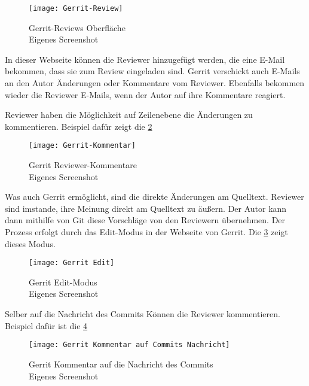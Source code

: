 \begin{figure}[H]
	\centering
	\texttt{[image: Gerrit-Review]}
	\caption[Gerrit Reviews Oberfläche]{Gerrit-Reviews Oberfläche\\Eigenes Screenshot}
	\label{fig:Gerrit-Review}
\end{figure}

In dieser Webseite können die Reviewer hinzugefügt werden, die eine E-Mail bekommen, dass sie zum Review eingeladen sind. Gerrit verschickt auch E-Mails an den Autor Änderungen oder Kommentare vom Reviewer. Ebenfalls bekommen wieder die Reviewer E-Mails, wenn der Autor auf ihre Kommentare reagiert.

Reviewer haben die Möglichkeit auf Zeilenebene die Änderungen zu kommentieren. Beispiel dafür zeigt die \cref{fig:Gerrit Reviewer-Kommentare} 

\begin{figure}[H]
	\centering
	\texttt{[image: Gerrit-Kommentar]}
	\caption[Gerrit Reviewer-Kommentare]{Gerrit Reviewer-Kommentare\\Eigenes Screenshot}
	\label{fig:Gerrit Reviewer-Kommentare}
\end{figure}

Was auch Gerrit ermöglicht, sind die direkte Änderungen am Quelltext. Reviewer sind imstande, ihre Meinung direkt am Quelltext zu äußern. Der Autor kann dann mithilfe von Git diese Vorschläge von den Reviewern übernehmen. Der Prozess erfolgt durch das Edit-Modus in der Webseite von Gerrit. Die \cref{fig:Gerrit Edit-Modus} zeigt dieses Modus.

\begin{figure}[H]
	\centering
	\texttt{[image: Gerrit Edit]}
	\caption[Gerrit Edit-Modus]{Gerrit Edit-Modus\\Eigenes Screenshot}
	\label{fig:Gerrit Edit-Modus}
\end{figure}

Selber auf die Nachricht des Commits Können die Reviewer kommentieren. Beispiel dafür ist die \ref{fig:Gerrit Kommentar auf Commits Nachricht}

\begin{figure}[H]
	\centering
	\texttt{[image: Gerrit Kommentar auf Commits Nachricht]}
	\caption[Gerrit Kommentar auf die Nachricht des Commits]{Gerrit Kommentar auf die Nachricht des Commits\\Eigenes Screenshot}
	\label{fig:Gerrit Kommentar auf Commits Nachricht}
\end{figure}

